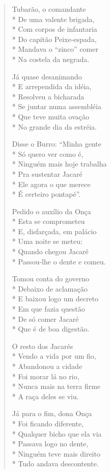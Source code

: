 \begin{verse}
Tubarão, o comandante\\*
De uma valente brigada,\\*
Com corpos de infantaria\\*
Do capitão Peixe-espada,\\*
Mandava o “zinco” comer\\*
Na costela da negrada.

Já quase desanimando\\*
E arrependida da idéia,\\*
Resolveu a bicharada\\*
Se juntar numa assembléia\\*
Que teve muita ovação\\*
No grande dia da estréia.

Disse o Burro: “Minha gente\\*
Só quero ver como é,\\*
Ninguém mais hoje trabalha\\*
Pra sustentar Jacaré\\*
Ele agora o que merece\\*
É certeiro pontapé”.

Pedido o auxílio da Onça\\*
Esta se comprometeu\\*
E, disfarçada, em palácio\\*
Uma noite se meteu:\\*
Quando chegou Jacaré\\*
Passou-lhe o dente e comeu.

Tomou conta do governo\\*
Debaixo de aclamação\\*
E baixou logo um decreto\\*
Em que fazia questão\\*
De só comer Jacaré\\*
Que é de boa digestão.

O resto dos Jacarés\\*
Vendo a vida por um fio,\\*
Abandonou a cidade\\*
Foi morar lá no rio,\\*
Nunca mais na terra firme\\*
A raça deles se viu.

Já para o fim, dona Onça\\*
Foi ficando diferente,\\*
Qualquer bicho que ela via\\*
Passava logo no dente,\\*
Ninguém teve mais direito\\*
Tudo andava descontente.


\end{verse}
